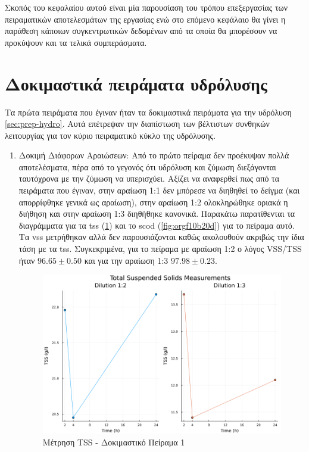\documentclass[11pt]{report}
\begin{document}
Σκοπός του κεφαλαίου αυτού είναι μία παρουσίαση του τρόπου επεξεργασίας των πειραματικών αποτελεσμάτων της εργασίας ενώ στο επόμενο κεφάλαιο θα γίνει η παράθεση κάποιων συγκεντρωτικών δεδομένων από τα οποία θα μπορέσουν να προκύψουν και τα τελικά συμπεράσματα.

\section{Δοκιμαστικά πειράματα υδρόλυσης}
\label{sec:org3dbf665}
Τα πρώτα πειράματα που έγιναν ήταν τα δοκιμαστικά πειράματα για την υδρόλυση \autoref{sec:prep-hydro}. Αυτά επέτρεψαν την διαπίστωση των βέλτιστων συνθηκών λειτουργίας για τον κύριο πειραματικό κύκλο της υδρόλυσης.

\begin{enumerate}
\item Δοκιμή Διάφορων Αραιώσεων:
\label{sec:org3b64622}
Από το πρώτο πείραμα δεν προέκυψαν πολλά αποτελέσματα, πέρα από το γεγονός ότι υδρόλυση και ζύμωση διεξάγονται ταυτόχρονα με την ζύμωση να υπερισχύει. Αξίζει να αναφερθεί πως από τα πειράματα που έγιναν, στην αραίωση 1:1 δεν μπόρεσε να διηθηθεί το δείγμα (και απορρίφθηκε γενικά ως αραίωση), στην αραίωση 1:2 ολοκληρώθηκε οριακά η διήθηση και στην αραίωση 1:3 διηθήθηκε κανονικά. Παρακάτω παρατίθενται τα διαγράμματα για τα \acrfull{tss} (\ref{fig:org79d4898}) και το \acrfull{scod} (\ref{fig:orgf10b20d}) για το πείραμα αυτό. Τα \acrfull{vss} μετρήθηκαν αλλά δεν παρουσιάζονται καθώς ακολουθούν ακριβώς την ίδια τάση με τα \acrfull{tss}. Συγκεκριμένα, για το πείραμα με αραίωση 1:2 ο λόγος VSS/TSS ήταν \(96.65 \pm 0.50\) και για την αραίωση 1:3 \(97.98 \pm 0.23\). 

\begin{figure}[htbp]
\centering
\includegraphics[width=.9\linewidth]{../plots/10_10/tss_plot.png}
\caption{\label{fig:org79d4898}Μέτρηση TSS - Δοκιμαστικό Πείραμα 1}
\end{figure}


\end{enumerate}
\end{document}
